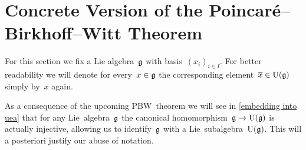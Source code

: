 \section{Concrete Version of the Poincar\'{e}--Birkhoff--Witt Theorem}


\begin{convention}
  For this section we fix a Lie algebra~$\mathfrak{g}$ with basis~$(x_i)_{i \in I}$.
  For better readability we will denote for every~$x \in \mathfrak{g}$ the corresponding element~$\overline{x} \in \operatorname{U}(\mathfrak{g})$ simply by~$x$ again.
\end{convention}


\begin{remark}
  As a consequence of the upcoming PBW~theorem we will see in \cref{embedding into uea} that for any Lie~algebra~$\mathfrak{g}$ the canonical homomorphism~$\glie \to \Univ(\glie)$ is actually injective, allowing us to identify~$\mathfrak{g}$ with a Lie~subalgebra~$\operatorname{U}(\mathfrak{g})$.
  This will a posteriori justify our abuse of notation.
\end{remark}


